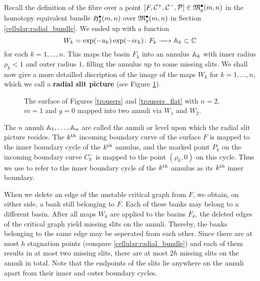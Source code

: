 Recall the definition of the fibre over a point $[F, \mathcal C^+, \mathcal C^-, \mathcal P] \in \mathfrak{M}^\bullet_g(m, n)$ in the homotopy equivalent bundle $\mathfrak{H}^{\bullet}_g(m, n)$ over $\mathfrak{M}^\bullet_g(m, n)$ in Section \ref{cellular:radial_bundle}.
We ended up with a function
\[
   W_k = \exp(-u_k) \exp(- i v_k) \colon F_k \xrightarrow{\hspace{6pt}{}\hspace{6pt}} \mathbb A_k \subset \mathbb C
\]
for each $k = 1, \dotsc, n$.
This maps the basin $F_k$ into an annulus $\mathbb A_k$ with inner radius $\rho_k < 1$ and outer radius $1$,
filling the annulus up to some missing slits.
We shall now give a more detailled discription of the image of the maps $W_k$ for $k = 1, \dotsc, n$, 
which we call a \textbf{radial slit picture} (see Figure \ref{trousers_radial}).
\begin{figure}[ht]
    \centering
    \def\svgwidth{.7\columnwidth}
    
    \caption{
        \label{trousers_radial}
        The surface of Figures \ref{trousers} and \ref{trousers_flat} with $n = 2$, $m = 1$ and $g = 0$ mapped into two annuli via $W_1$ and $W_2$.}
\end{figure}

The $n$ annuli $\mathbb A_1, \dotsc, \mathbb A_n$ are called the annuli or level upon which the radial slit picture resides.
The $k^{\text{th}}$ incoming boundary curve of the surface $F$ is mapped to the inner boundary cycle of the $k^{\text{th}}$ annulus,
and the marked point $P_k$ on the incoming boundary curve $C^-_k$ is mapped to the point $(\rho_k, 0)$ on this cycle.
Thus we use to refer to the inner boundary cycle of the $k^{\text{th}}$ annulus as its $k^{\text{th}}$ inner boundary.

When we delete an edge of the unstable critical graph from $F$, we obtain, on either side, a bank still belonging to $F$.
Each of these banks may belong to a different basin.
After all maps $W_k$ are applied to the basins $F_k$,
the deleted edges of the critical graph yield missing slits on the annuli.
Thereby, the banks belonging to the same edge may be seperated from each other.
Since there are at most $h$ stagnation points (compare \ref{cellular:radial_bundle}) and each of them results in at most two missing slits,
there are at most $2h$ missing slits on the annuli in total. 
Note that the endpoints of the slits lie anywhere on the annuli apart from their inner and outer boundary cycles. 


